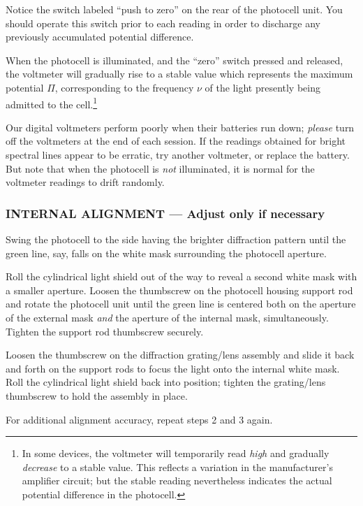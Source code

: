 Notice the switch labeled ``push to zero'' on the rear of the photocell
unit. You should operate this switch prior to each reading in order to
discharge any previously accumulated potential difference.

When the photocell is illuminated, and the ``zero'' switch pressed and
released, the voltmeter will gradually rise to a stable value which
represents the maximum potential $\Pi$, corresponding to the
frequency $\nu$ of the light presently being admitted to the
cell.\footnote{In some devices, the voltmeter will temporarily read
  \emph{high} and gradually \emph{decrease} to a stable value. This
  reflects a variation in the manufacturer's amplifier circuit; but the
  stable reading nevertheless indicates the actual potential difference
  in the photocell.}

Our digital voltmeters perform poorly when their batteries run down;
\emph{please} turn off the voltmeters at the end of each session. If the
readings obtained for bright spectral lines appear to be erratic, try
another voltmeter, or replace the battery. But note that when the
photocell is \emph{not} illuminated, it is normal for the voltmeter
readings to drift randomly.

\subsubsection*{INTERNAL ALIGNMENT --- Adjust only if necessary}

\begin{tight_enumerate}
\item Swing the photocell to the side having the brighter diffraction
pattern until the green line, say, falls on the white mask surrounding
the photocell aperture.

\item Roll the cylindrical light shield out of the way to reveal a second
white mask with a smaller aperture. Loosen the thumbscrew on the
photocell housing support rod and rotate the photocell unit until the
green line is centered both on the aperture of the external mask
\emph{and} the aperture of the internal mask, simultaneously. Tighten
the support rod thumbscrew securely.

\item Loosen the thumbscrew on the diffraction grating/lens assembly and
slide it back and forth on the support rods to focus the light onto the
internal white mask. Roll the cylindrical light shield back into
position; tighten the grating/lens thumbscrew to hold the assembly in
place.

\item For additional alignment accuracy, repeat steps 2 and 3 again.
\end{tight_enumerate}
